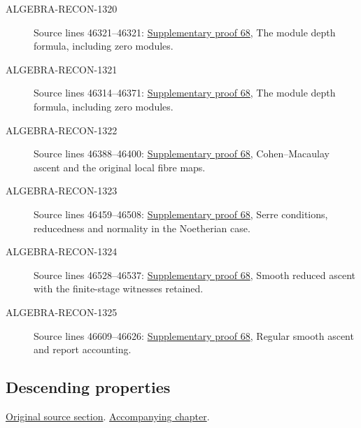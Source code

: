 \begin{description}
\item[ALGEBRA-RECON-1320] Source lines 46321--46321: \hyperlink{algebra_ascent_notes_20260929}{Supplementary proof 68}, The module depth formula, including zero modules.
\item[ALGEBRA-RECON-1321] Source lines 46314--46371: \hyperlink{algebra_ascent_notes_20260929}{Supplementary proof 68}, The module depth formula, including zero modules.
\item[ALGEBRA-RECON-1322] Source lines 46388--46400: \hyperlink{algebra_ascent_notes_20260929}{Supplementary proof 68}, Cohen–Macaulay ascent and the original local fibre maps.
\item[ALGEBRA-RECON-1323] Source lines 46459--46508: \hyperlink{algebra_ascent_notes_20260929}{Supplementary proof 68}, Serre conditions, reducedness and normality in the Noetherian case.
\item[ALGEBRA-RECON-1324] Source lines 46528--46537: \hyperlink{algebra_ascent_notes_20260929}{Supplementary proof 68}, Smooth reduced ascent with the finite-stage witnesses retained.
\item[ALGEBRA-RECON-1325] Source lines 46609--46626: \hyperlink{algebra_ascent_notes_20260929}{Supplementary proof 68}, Regular smooth ascent and report accounting.
\end{description}

\subsection{Descending properties}
\hypertarget{algebra-source-section-descending-properties}{}
\noindent\href{https://github.com/stacks/stacks-project/blob/a04446e57ec1fbc252a871afcec7752fb2807b14/algebra.tex\#L46633}{Original source section}. \href{algebra.pdf\#nameddest=section-descending-properties}{Accompanying chapter}.

